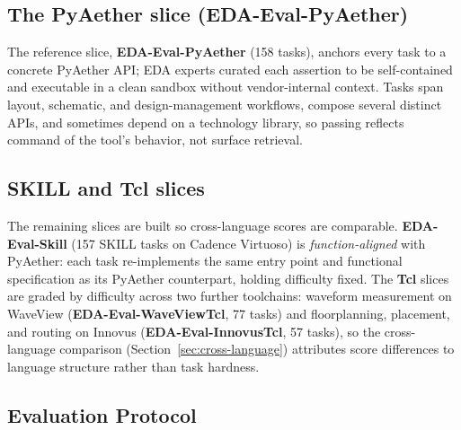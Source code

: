 \subsection{The PyAether slice (EDA-Eval-PyAether)}

The reference slice, \textbf{EDA-Eval-PyAether} (158 tasks), anchors every task to a concrete PyAether API; EDA experts curated each assertion to be self-contained and executable in a clean sandbox without vendor-internal context. Tasks span layout, schematic, and design-management workflows, compose several distinct APIs, and sometimes depend on a technology library, so passing reflects command of the tool's behavior, not surface retrieval.

\subsection{SKILL and Tcl slices}
\label{sec:benchmark-slices}

The remaining slices are built so cross-language scores are comparable. \textbf{EDA-Eval-Skill} (157 SKILL tasks on Cadence Virtuoso) is \emph{function-aligned} with PyAether: each task re-implements the same entry point and functional specification as its PyAether counterpart, holding difficulty fixed. The \textbf{Tcl} slices are graded by difficulty across two further toolchains: waveform measurement on WaveView (\textbf{EDA-Eval-WaveViewTcl}, 77 tasks) and floorplanning, placement, and routing on Innovus (\textbf{EDA-Eval-InnovusTcl}, 57 tasks), so the cross-language comparison (Section~\ref{sec:cross-language}) attributes score differences to language structure rather than task hardness.

\subsection{Evaluation Protocol}

